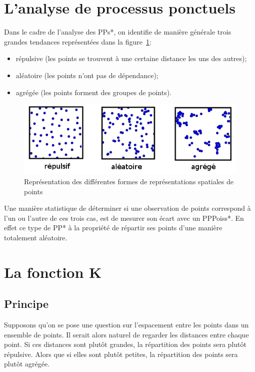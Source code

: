 \documentclass[stage2a]{tnreport}
\begin{document}
\section{L'analyse de processus ponctuels}

Dans le cadre de l'analyse des \gls{PP}s*, on identifie de manière générale trois grandes tendances représentées dans la figure~\ref{fig:repartition}:
\begin{itemize}
\item répulsive (les points se trouvent à une certaine distance les uns des autres);
\item aléatoire (les points n'ont pas de dépendance);
\item agrégée (les points forment des groupes de points).
\end{itemize}

\begin{figure}[h]
  \centering
  \includegraphics[scale=0.6]{figures/repartition2.png}
  \caption{Représentation des différentes formes de représentations spatiales de points}
  \label{fig:repartition}
\end{figure}

Une manière statistique de déterminer si une observation de points correspond à l'un ou l'autre de ces trois cas, est de mesurer son écart avec un \gls{PPPoiss}*. En effet ce type de \gls{PP}* à la propriété de répartir ses points d'une manière totalement aléatoire.


\section{La fonction K}

\subsection{Principe}
Supposons qu'on se pose une question sur l'espacement entre les points dans un ensemble de points. Il serait alors naturel de regarder les distances entre chaque point. Si ces distances sont plutôt grandes, la répartition des points sera plutôt répulsive. Alors que si elles sont plutôt petites, la répartition des points sera plutôt agrégée.
\end{document}
